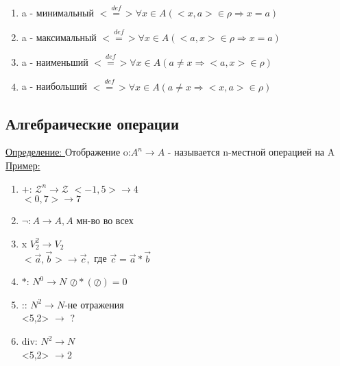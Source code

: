 \documentclass[12pt]{article}
\begin{document}
    \begin{enumerate}
        \item a - минимальный $\overset{def}{<=>} \forall x \in A (<x,a> \in \rho \Rightarrow x =a)$
        \item a - максимальный $\overset{def}{<=>} \forall x \in A (<a,x> \in \rho \Rightarrow x =a)$
        \item a - наименьший $\overset{def}{<=>} \forall x \in A (a \not = x \Rightarrow <a,x> \in \rho)$
        \item a - наибольший $\overset{def}{<=>} \forall x \in A (a \not = x \Rightarrow <x,a> \in \rho)$
    \end{enumerate}

    \subsection{Алгебраические операции}%
    \underline{Определение: } Отображение o:$A^n \rightarrow A$ - называется n-местной 
    операцией на A\\
    \underline{Пример:}
    \begin{enumerate}
        \item +: $\mathcal{Z}^n \rightarrow \mathcal{Z}$
        $<-1,5> \rightarrow 4$\\
        $<0,7> \rightarrow 7$
        \item $\lnot: A \rightarrow A, A$ мн-во во всех
        \item x $V_2^2 \rightarrow V_2$\\
        $<\overset{\rightarrow}{a},\overset{\rightarrow}{b}> \rightarrow \overset{\rightarrow}{c}
        ,$ где $\overset{\rightarrow}{c}=\overset{\rightarrow}{a}*\overset{\rightarrow}{b}$
        \item $\ast $: $N^0\rightarrow N$
        ${\oslash } \ast(\oslash)=0$
        \item :: $N^2 \rightarrow N$-не отражения\\
        <5,2> $\rightarrow$ ?
        \item div: $N^2\rightarrow N$\\
        <5,2> $\rightarrow$2
    \end{enumerate}
\end{document}
